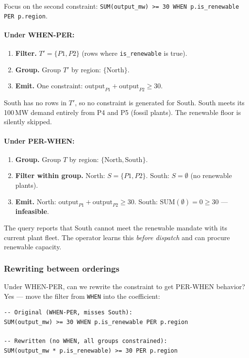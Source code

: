 \documentclass[11pt]{article}
\begin{document}
Focus on the second constraint: \texttt{SUM(output\_mw) >= 30 WHEN p.is\_renewable PER p.region}.

\paragraph{Under WHEN-PER:}
\begin{enumerate}[leftmargin=2em]
    \item \textbf{Filter.} $T' = \{P1, P2\}$ (rows where \texttt{is\_renewable} is true).
    \item \textbf{Group.} Group $T'$ by region: $\{\text{North}\}$.
    \item \textbf{Emit.} One constraint: $\text{output}_{P1} + \text{output}_{P2} \geq 30$.
\end{enumerate}
South has no rows in $T'$, so no constraint is generated for South.
South meets its 100\,MW demand entirely from P4 and P5 (fossil plants).
The renewable floor is silently skipped.

\paragraph{Under PER-WHEN:}
\begin{enumerate}[leftmargin=2em]
    \item \textbf{Group.} Group $T$ by region: $\{\text{North}, \text{South}\}$.
    \item \textbf{Filter within group.}
        North: $S = \{P1, P2\}$.
        South: $S = \emptyset$ (no renewable plants).
    \item \textbf{Emit.}
        North: $\text{output}_{P1} + \text{output}_{P2} \geq 30$.
        South: $\text{SUM}(\emptyset) = 0 \geq 30$ --- \textbf{infeasible}.
\end{enumerate}
The query reports that South cannot meet the renewable mandate with its
current plant fleet. The operator learns this \emph{before dispatch} and
can procure renewable capacity.

\subsubsection*{Rewriting between orderings}

Under WHEN-PER, can we rewrite the constraint to get PER-WHEN behavior?
Yes --- move the filter from \texttt{WHEN} into the coefficient:

\begin{lstlisting}
-- Original (WHEN-PER, misses South):
SUM(output_mw) >= 30 WHEN p.is_renewable PER p.region

-- Rewritten (no WHEN, all groups constrained):
SUM(output_mw * p.is_renewable) >= 30 PER p.region
\end{lstlisting}
\end{document}
